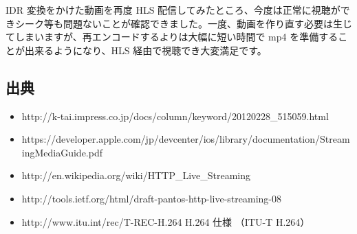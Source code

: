  IDR 変換をかけた動画を再度 HLS 配信してみたところ、今度は正常に視聴ができシーク等も問題ないことが確認できました。一度、動画を作り直す必要は生じてしまいますが、再エンコードするよりは大幅に短い時間で mp4 を準備することが出来るようになり、HLS 経由で視聴でき大変満足です。

\subsection{出典}
\begin{itemize}
\item http://k-tai.impress.co.jp/docs/column/keyword/20120228\_515059.html
\item https://developer.apple.com/jp/devcenter/ios/library/documentation/StreamingMediaGuide.pdf
\item http://en.wikipedia.org/wiki/HTTP\_Live\_Streaming
\item http://tools.ietf.org/html/draft-pantos-http-live-streaming-08
\item http://www.itu.int/rec/T-REC-H.264 H.264 仕様 （ITU-T H.264）
\end{itemize}
